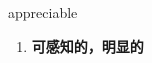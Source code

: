 
\begin{frame}
{\huge appreciable}
\begin{center}
\begin{enumerate}\Large
  \item \textbf{可感知的，明显的}
\end{enumerate}
\end{center}
\end{frame}
